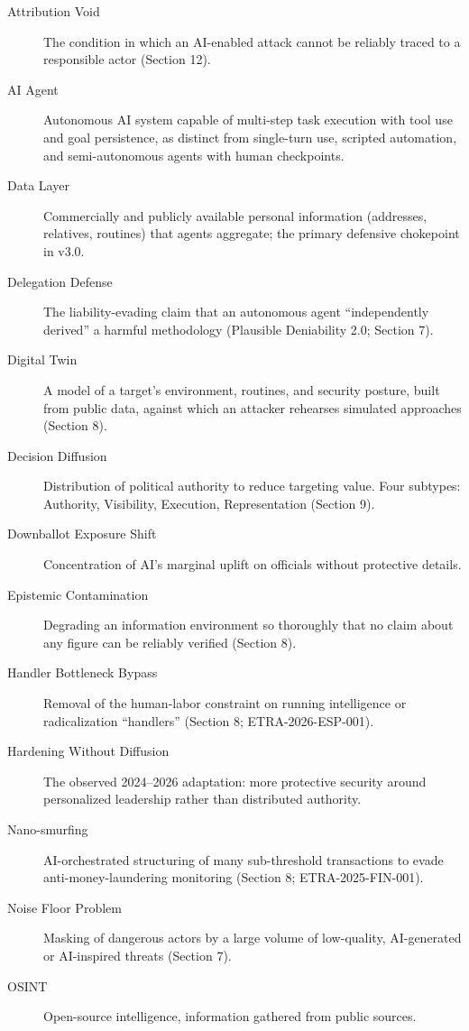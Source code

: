 \documentclass[11pt,letterpaper]{article}
\begin{document}
\begin{description}
  \item[Attribution Void] The condition in which an AI-enabled attack cannot be reliably traced to a responsible actor (Section 12).
  \item[AI Agent] Autonomous AI system capable of multi-step task execution with tool use and goal persistence, as distinct from single-turn use, scripted automation, and semi-autonomous agents with human checkpoints.
  \item[Data Layer] Commercially and publicly available personal information (addresses, relatives, routines) that agents aggregate; the primary defensive chokepoint in v3.0.
  \item[Delegation Defense] The liability-evading claim that an autonomous agent ``independently derived'' a harmful methodology (Plausible Deniability 2.0; Section 7).
  \item[Digital Twin] A model of a target's environment, routines, and security posture, built from public data, against which an attacker rehearses simulated approaches (Section 8).
  \item[Decision Diffusion] Distribution of political authority to reduce targeting value. Four subtypes: Authority, Visibility, Execution, Representation (Section 9).
  \item[Downballot Exposure Shift] Concentration of AI's marginal uplift on officials without protective details.
  \item[Epistemic Contamination] Degrading an information environment so thoroughly that no claim about any figure can be reliably verified (Section 8).
  \item[Handler Bottleneck Bypass] Removal of the human-labor constraint on running intelligence or radicalization ``handlers'' (Section 8; ETRA-2026-ESP-001).
  \item[Hardening Without Diffusion] The observed 2024--2026 adaptation: more protective security around personalized leadership rather than distributed authority.
  \item[Nano-smurfing] AI-orchestrated structuring of many sub-threshold transactions to evade anti-money-laundering monitoring (Section 8; ETRA-2025-FIN-001).
  \item[Noise Floor Problem] Masking of dangerous actors by a large volume of low-quality, AI-generated or AI-inspired threats (Section 7).
  \item[OSINT] Open-source intelligence, information gathered from public sources.

\end{description}
\end{document}
